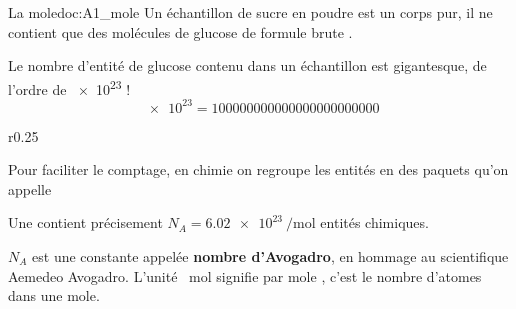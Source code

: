 

\begin{doc}{La mole}{doc:A1_mole}
  Un échantillon de sucre en poudre est un corps pur, il ne contient que des molécules de glucose de formule brute .

  Le nombre d'entité de glucose contenu dans un échantillon est gigantesque, de l'ordre de \num{e23} !
  \begin{equation*}
    \num{e23} = \num{100 000 000 000 000 000 000 000}
  \end{equation*}

  \begin{wrapfigure}{r}{0.25\linewidth}
    \centering \vspace*{-50pt}
     \\[4pt]
  \end{wrapfigure}
  Pour faciliter le comptage, en chimie on regroupe les entités en des paquets qu'on appelle 
  \begin{encart}
    Une  contient précisement $N_A = \qty{6,02 e23}{\per\mole}$ entités chimiques.
  \end{encart}
  \attention $N_A$ est une constante appelée \textbf{nombre d'Avogadro}, en hommage au scientifique Aemedeo Avogadro.
  L'unité \og \unit{\per\mole} \fg\! signifie \og par mole \fg, c’est le nombre d'atomes dans une mole.
\end{doc}

